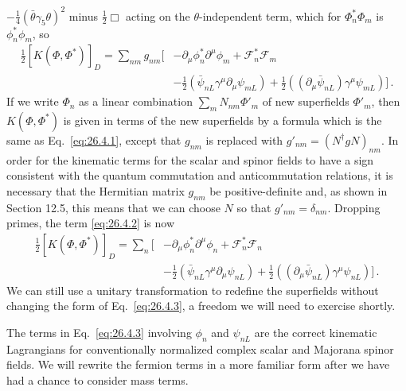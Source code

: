 \(-\frac14(\bar\theta\gamma_5\theta)^2\) minus \(\frac12\Box\) acting on the
\(\theta\)-independent term, which for \(\Phi_n^*\Phi_m\) is
\(\phi_n^*\phi_m\), so
\begin{equation}
  \begin{aligned}
  \frac12[K(\Phi,\Phi^*)]_D
  =\sum_{nm}g_{nm}\biggl[
    &-\partial_\mu\phi_n^*\partial^\mu\phi_m
    +\mathcal{F}_n^*\mathcal{F}_m
  \\
    &-\frac12(\bar\psi_{nL}\gamma^\mu\partial_\mu\psi_{mL})
    +\frac12((\partial_\mu\bar\psi_{nL})\gamma^\mu\psi_{mL})
  \biggr]\,.
  \end{aligned}
  \tag{26.4.2}\label{eq:26.4.2}
\end{equation}
If we write \(\Phi_n\) as a linear combination
\(\sum_mN_{nm}\Phi'_m\) of new superfields \(\Phi'_m\), then
\(K(\Phi,\Phi^*)\) is given in terms of the new superfields by a formula which
is the same as Eq.~\eqref{eq:26.4.1}, except that \(g_{nm}\) is replaced with
\(g'_{nm}=(N^\dagger gN)_{nm}\). In order for the kinematic terms for the
scalar and spinor fields to have a sign consistent with the quantum
commutation and anticommutation relations, it is necessary that the Hermitian
matrix \(g_{nm}\) be positive-definite and, as shown in Section 12.5, this
means that we can choose \(N\) so that \(g'_{nm}=\delta_{nm}\). Dropping
primes, the term \eqref{eq:26.4.2} is now
\begin{equation}
  \begin{aligned}
  \frac12[K(\Phi,\Phi^*)]_D
  =\sum_n\biggl[
    &-\partial_\mu\phi_n^*\partial^\mu\phi_n
    +\mathcal{F}_n^*\mathcal{F}_n
  \\
    &-\frac12(\bar\psi_{nL}\gamma^\mu\partial_\mu\psi_{nL})
    +\frac12((\partial_\mu\bar\psi_{nL})\gamma^\mu\psi_{nL})
  \biggr]\,.
  \end{aligned}
  \tag{26.4.3}\label{eq:26.4.3}
\end{equation}
We can still use a unitary transformation to redefine the superfields without
changing the form of Eq.~\eqref{eq:26.4.3}, a freedom we will need to exercise
shortly.

The terms in Eq.~\eqref{eq:26.4.3} involving \(\phi_n\) and \(\psi_{nL}\) are
the correct kinematic Lagrangians for conventionally normalized complex scalar
and Majorana spinor fields. We will rewrite the fermion terms in a more
familiar form after we have had a chance to consider mass terms.

